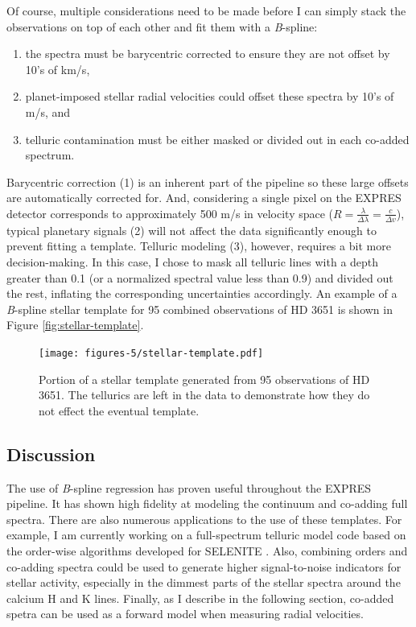 Of course, multiple considerations need to be made before I can simply stack the observations on top of each other and fit them with a \textit{B}-spline:
\begin{enumerate}
    \item the spectra must be barycentric corrected to ensure they are not offset by 10's of km/s,
    \item planet-imposed stellar radial velocities could offset these spectra by 10's of m/s, and
    \item telluric contamination must be either masked or divided out in each co-added spectrum.
\end{enumerate}
Barycentric correction (1) is an inherent part of the pipeline so these large offsets are automatically corrected for. And, considering a single pixel on the EXPRES detector corresponds to approximately 500 m/s in velocity space ($R = \frac{\lambda}{\Delta\lambda} = \frac{c}{\Delta v}$), typical planetary signals (2) will not affect the data significantly enough to prevent fitting a template. Telluric modeling (3), however, requires a bit more decision-making. In this case, I chose to mask all telluric lines with a depth greater than 0.1 (or a normalized spectral value less than 0.9) and divided out the rest, inflating the corresponding uncertainties accordingly. An example of a \textit{B}-spline stellar template for 95 combined observations of HD 3651 is shown in Figure \ref{fig:stellar-template}. 

\begin{figure}
    \centering
    \texttt{[image: figures-5/stellar-template.pdf]}
    \caption{Portion of a stellar template generated from 95 observations of HD 3651. The tellurics are left in the data to demonstrate how they do not effect the eventual template.}
    \label{fig:stellar-template.pdf}
\end{figure}

\subsection{Discussion}

The use of \textit{B}-spline regression has proven useful throughout the EXPRES pipeline. It has shown high fidelity at modeling the continuum and co-adding full spectra. There are also numerous applications to the use of these templates. For example, I am currently working on a full-spectrum telluric model code based on the order-wise algorithms developed for SELENITE \citep{leet_toward_2019}. Also, combining orders and co-adding spectra could be used to generate higher signal-to-noise indicators for stellar activity, especially in the dimmest parts of the stellar spectra around the calcium H and K lines. Finally, as I describe in the following section, co-added spetra can be used as a forward model when measuring radial velocities.

